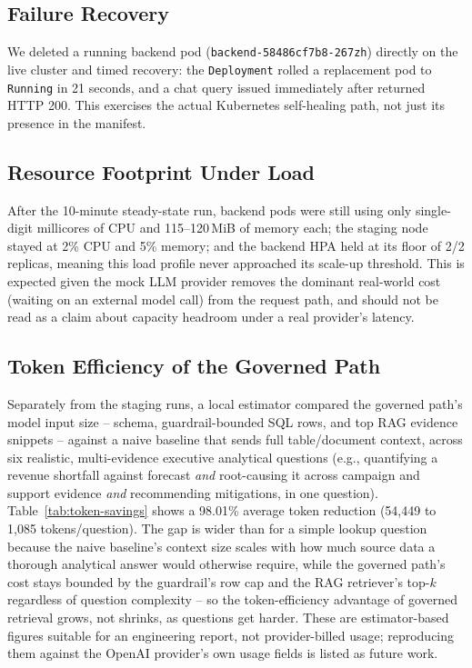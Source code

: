 \documentclass[conference]{IEEEtran}
\begin{document}
\subsection{Failure Recovery}
We deleted a running backend pod (\texttt{backend-58486cf7b8-267zh})
directly on the live cluster and timed recovery: the \texttt{Deployment}
rolled a replacement pod to \texttt{Running} in 21 seconds, and a chat
query issued immediately after returned HTTP 200. This exercises the
actual Kubernetes self-healing path, not just its presence in the
manifest.

\subsection{Resource Footprint Under Load}
After the 10-minute steady-state run, backend pods were still using only
single-digit millicores of CPU and 115--120\,MiB of memory each; the
staging node stayed at 2\% CPU and 5\% memory; and the backend HPA held at
its floor of 2/2 replicas, meaning this load profile never approached its
scale-up threshold. This is expected given the mock LLM provider removes
the dominant real-world cost (waiting on an external model call) from the
request path, and should not be read as a claim about capacity headroom
under a real provider's latency.

\subsection{Token Efficiency of the Governed Path}
Separately from the staging runs, a local estimator compared the governed
path's model input size -- schema, guardrail-bounded SQL rows, and top
RAG evidence snippets -- against a naive baseline that sends full
table/document context, across six realistic, multi-evidence executive
analytical questions (e.g., quantifying a revenue shortfall against
forecast \emph{and} root-causing it across campaign and support evidence
\emph{and} recommending mitigations, in one question). Table~\ref{tab:token-savings}
shows a 98.01\% average token reduction (54{,}449 to 1{,}085 tokens/question).
The gap is wider than for a simple lookup question because the naive
baseline's context size scales with how much source data a thorough
analytical answer would otherwise require, while the governed path's cost
stays bounded by the guardrail's row cap and the RAG retriever's top-$k$
regardless of question complexity -- so the token-efficiency advantage of
governed retrieval grows, not shrinks, as questions get harder. These are
estimator-based figures suitable for an engineering report, not
provider-billed usage; reproducing them against the OpenAI provider's own
usage fields is listed as future work.
\end{document}
